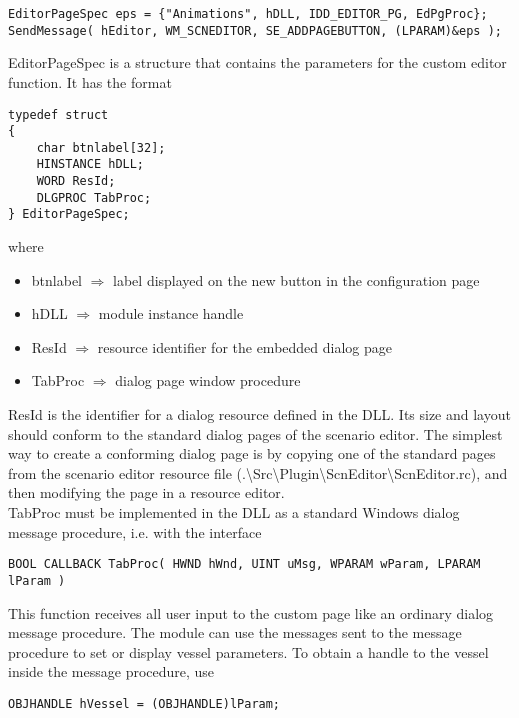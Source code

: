 \documentclass[Orbiter Developer Manual.tex]{subfiles}
\begin{document}
\begin{lstlisting}
EditorPageSpec eps = {"Animations", hDLL, IDD_EDITOR_PG, EdPgProc};
SendMessage( hEditor, WM_SCNEDITOR, SE_ADDPAGEBUTTON, (LPARAM)&eps );
\end{lstlisting}

\noindent
EditorPageSpec is a structure that contains the parameters for the custom editor function. It has the format

\begin{lstlisting}
typedef struct
{
	char btnlabel[32];
	HINSTANCE hDLL;
	WORD ResId;
	DLGPROC TabProc;
} EditorPageSpec;
\end{lstlisting}

\noindent
where

\begin{itemize}
\item btnlabel $\Rightarrow$ label displayed on the new button in the configuration page
\item hDLL $\Rightarrow$ module instance handle
\item ResId $\Rightarrow$ resource identifier for the embedded dialog page
\item TabProc $\Rightarrow$ dialog page window procedure
\end{itemize}

\noindent
ResId is the identifier for a dialog resource defined in the DLL. Its size and layout should conform to the standard dialog pages of the scenario editor. The simplest way to create a conforming dialog page is by copying one of the standard pages from the scenario editor resource file (.\textbackslash Src\textbackslash Plugin\textbackslash ScnEditor\textbackslash ScnEditor.rc), and then modifying the page in a resource editor.\\
TabProc must be implemented in the DLL as a standard Windows dialog message procedure, i.e. with the interface

\begin{lstlisting}
BOOL CALLBACK TabProc( HWND hWnd, UINT uMsg, WPARAM wParam, LPARAM lParam )
\end{lstlisting}

\noindent
This function receives all user input to the custom page like an ordinary dialog message procedure. The module can use the messages sent to the message procedure to set or display vessel parameters. To obtain a handle to the vessel inside the message procedure, use

\begin{lstlisting}
OBJHANDLE hVessel = (OBJHANDLE)lParam;
\end{lstlisting}
\end{document}
